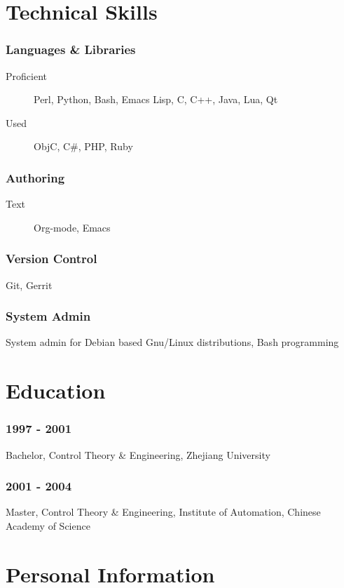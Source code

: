 \documentclass[11pt,dvipdfmx,CJKbookmarks]{article}
\begin{document}
\begin{CJK*}{UTF8}{simsun}
\section{Technical Skills}
\label{sec-3}

\subsubsection{Languages \& Libraries}
\label{sec-3-0-1}
\begin{description}
\item[{Proficient}] Perl, Python, Bash, Emacs Lisp, C, C++, Java, Lua, Qt

\item[{Used}] ObjC, C\#, PHP, Ruby
\end{description}
\subsubsection{Authoring}
\label{sec-3-0-2}
\begin{description}
\item[{Text}] Org-mode, Emacs
\end{description}
\subsubsection{Version Control}
\label{sec-3-0-3}
Git, Gerrit
\subsubsection{System Admin}
\label{sec-3-0-4}
System admin for Debian based Gnu/Linux distributions, Bash
programming

\section{Education}
\label{sec-4}

\subsubsection{1997 - 2001}
\label{sec-4-0-1}
Bachelor, Control Theory \& Engineering, Zhejiang University
\subsubsection{2001 - 2004}
\label{sec-4-0-2}
Master, Control Theory \& Engineering, Institute of Automation,
Chinese Academy of Science

\section{Personal Information}
\label{sec-5}

\end{CJK*}
\end{document}
